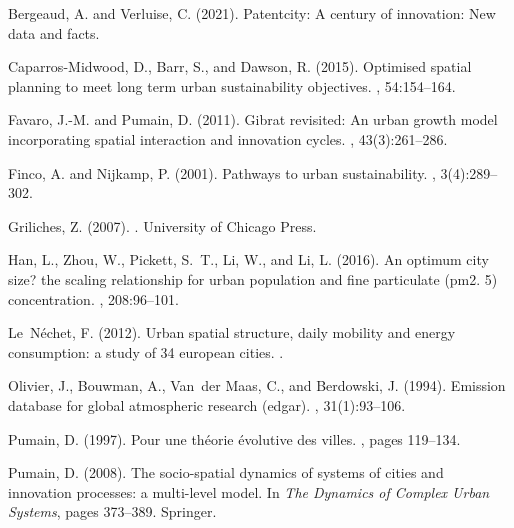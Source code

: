 \documentclass{article}
\begin{document}
\begin{thebibliography}{}

Bergeaud, A. and Verluise, C. (2021).
\newblock Patentcity: A century of innovation: New data and facts.

Caparros-Midwood, D., Barr, S., and Dawson, R. (2015).
\newblock Optimised spatial planning to meet long term urban sustainability
  objectives.
, 54:154--164.

Favaro, J.-M. and Pumain, D. (2011).
\newblock Gibrat revisited: An urban growth model incorporating spatial
  interaction and innovation cycles.
, 43(3):261--286.

Finco, A. and Nijkamp, P. (2001).
\newblock Pathways to urban sustainability.
, 3(4):289--302.

Griliches, Z. (2007).
.
\newblock University of Chicago Press.

Han, L., Zhou, W., Pickett, S.~T., Li, W., and Li, L. (2016).
\newblock An optimum city size? the scaling relationship for urban population
  and fine particulate (pm2. 5) concentration.
, 208:96--101.

Le~N{\'e}chet, F. (2012).
\newblock Urban spatial structure, daily mobility and energy consumption: a
  study of 34 european cities.
.

Olivier, J., Bouwman, A., Van~der Maas, C., and Berdowski, J. (1994).
\newblock Emission database for global atmospheric research (edgar).
, 31(1):93--106.

Pumain, D. (1997).
\newblock Pour une th{\'e}orie {\'e}volutive des villes.
, pages 119--134.

Pumain, D. (2008).
\newblock The socio-spatial dynamics of systems of cities and innovation
  processes: a multi-level model.
\newblock In {\em The Dynamics of Complex Urban Systems}, pages 373--389.
  Springer.


\end{thebibliography}
\end{document}
